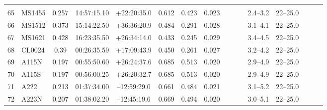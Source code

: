 \documentclass[useAMS,usenatbib]{mnras}
\begin{document}
\begin{table}
\begin{tabular*}{1.0\textwidth}{ l l c c c r c c c c c c c c c c }
 \hline
 \\
65 & MS1455 & 0.257 & 14:57:15.10 & +22:20:35.0 & 0.612 & 0.423 & 0.023 \hspace{8pt}& & & \hspace{8pt}& 2.4--3.2 \hspace{8pt}& 22--25.0 \\
66 & MS1512 & 0.373 & 15:14:22.50 & +36:36:20.9 & 0.484 & 0.291 & 0.028 \hspace{8pt}& & & \hspace{8pt}& 3.1--4.1 \hspace{8pt}& 22--25.0 \\
67 & MS1621 & 0.428 & 16:23:35.50 & +26:34:14.0 & 0.433 & 0.245 & 0.029 \hspace{8pt}& & & \hspace{8pt}& 3.4--4.5 \hspace{8pt}& 22--25.0 \\
68 & CL0024 & 0.39 & 00:26:35.59 & +17:09:43.9 & 0.450 & 0.261 & 0.027 \hspace{8pt}& & & \hspace{8pt}& 3.2--4.2 \hspace{8pt}& 22--25.0 \\
69 & A115N & 0.197 & 00:55:50.60 & +26:24:37.6 & 0.685 & 0.513 & 0.020 \hspace{8pt}& & & \hspace{8pt}& 2.9--4.9 \hspace{8pt}& 22--25.0 \\
70 & A115S & 0.197 & 00:56:00.25 & +26:20:32.7 & 0.685 & 0.513 & 0.020 \hspace{8pt}& & & \hspace{8pt}& 2.9--4.9 \hspace{8pt}& 22--25.0 \\
71 & A222 & 0.213 & 01:37:34.00 & \hspace{1.5pt}--\hspace{0.5pt}12:59:29.0 & 0.661 & 0.484 & 0.021 \hspace{8pt}& & & \hspace{8pt}& 3.1--5.2 \hspace{8pt}& 22--25.0 \\
72 & A223N & 0.207 & 01:38:02.20 & \hspace{1.5pt}--\hspace{0.5pt}12:45:19.6 & 0.669 & 0.494 & 0.020 \hspace{8pt}& & & \hspace{8pt}& 3.0--5.1 \hspace{8pt}& 22--25.0 \\

\end{tabular*}
\end{table}
\end{document}
